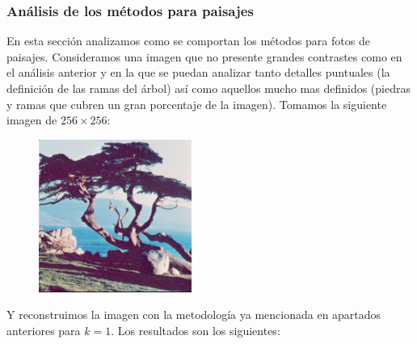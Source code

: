 \subsubsection{Análisis de los métodos para paisajes}

En esta sección analizamos como se comportan los métodos para fotos de paisajes. Consideramos una imagen que no presente grandes contrastes como en el análisis anterior y en la que se puedan analizar tanto detalles puntuales (la definición de las ramas del árbol) así como aquellos mucho mas definidos (piedras y ramas que cubren un gran porcentaje de la imagen). Tomamos la siguiente imagen de $256 \times 256$:

\begin{figure}[H]
\centering
\includegraphics[width=5cm]{fotos/paisaje/orig.png}
\end{figure}

Y reconstruimos la imagen con la metodología ya mencionada en apartados anteriores para $k=1$. Los resultados son los siguientes:


